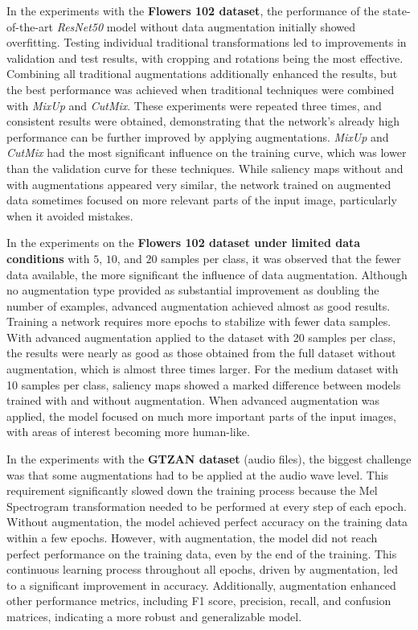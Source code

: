 In the experiments with the \textbf{Flowers 102 dataset}, the performance of the state-of-the-art \textit{ResNet50} model without data augmentation initially showed overfitting. Testing individual traditional transformations led to improvements in validation and test results, with cropping and rotations being the most effective. Combining all traditional augmentations additionally enhanced the results, but the best performance was achieved when traditional techniques were combined with \textit{MixUp} and \textit{CutMix}. These experiments were repeated three times, and consistent results were obtained, demonstrating that the network's already high performance can be further improved by applying augmentations. \textit{MixUp} and \textit{CutMix} had the most significant influence on the training curve, which was lower than the validation curve for these techniques. While saliency maps without and with augmentations appeared very similar, the network trained on augmented data sometimes focused on more relevant parts of the input image, particularly when it avoided mistakes.

In the experiments on the \textbf{Flowers 102 dataset under limited data conditions} with $5$, $10$, and $20$ samples per class, it was observed that the fewer data available, the more significant the influence of data augmentation. Although no augmentation type provided as substantial improvement as doubling the number of examples, advanced augmentation achieved almost as good results. Training a network requires more epochs to stabilize with fewer data samples. With advanced augmentation applied to the dataset with 20 samples per class, the results were nearly as good as those obtained from the full dataset without augmentation, which is almost three times larger. For the medium dataset with 10 samples per class, saliency maps showed a marked difference between models trained with and without augmentation. When advanced augmentation was applied, the model focused on much more important parts of the input images, with areas of interest becoming more human-like.

In the experiments with the \textbf{GTZAN dataset} (audio files), the biggest challenge was that some augmentations had to be applied at the audio wave level. This requirement significantly slowed down the training process because the Mel Spectrogram transformation needed to be performed at every step of each epoch. Without augmentation, the model achieved perfect accuracy on the training data within a few epochs. However, with augmentation, the model did not reach perfect performance on the training data, even by the end of the training. This continuous learning process throughout all epochs, driven by augmentation, led to a significant improvement in accuracy. Additionally, augmentation enhanced other performance metrics, including F1 score, precision, recall, and confusion matrices, indicating a more robust and generalizable model.

